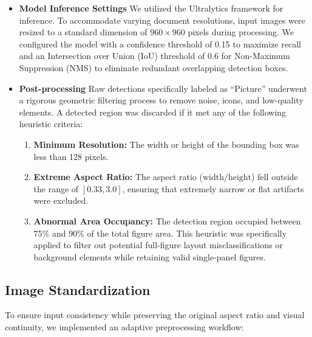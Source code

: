 \documentclass[runningheads]{llncs}
\begin{document}
\begin{itemize}
    \item \textbf{Model Inference Settings}
    We utilized the Ultralytics framework for inference. To accommodate varying document resolutions, input images were resized to a standard dimension of $960 \times 960$ pixels during processing. We configured the model with a confidence threshold of 0.15 to maximize recall and an Intersection over Union (IoU) threshold of 0.6 for Non-Maximum Suppression (NMS) to eliminate redundant overlapping detection boxes.
    
    \item \textbf{Post-processing}
    Raw detections specifically labeled as ``Picture'' underwent a rigorous geometric filtering process to remove noise, icons, and low-quality elements. A detected region was discarded if it met any of the following heuristic criteria:
    \begin{enumerate}
        \item \textbf{Minimum Resolution:} The width or height of the bounding box was less than 128 pixels.
        \item \textbf{Extreme Aspect Ratio:} The aspect ratio ($\text{width} / \text{height}$) fell outside the range of $[0.33, 3.0]$, ensuring that extremely narrow or flat artifacts were excluded.
        \item \textbf{Abnormal Area Occupancy:} The detection region occupied between $75\%$ and $90\%$ of the total figure area. This heuristic was specifically applied to filter out potential full-figure layout misclassifications or background elements while retaining valid single-panel figures.
    \end{enumerate}
\end{itemize}

\subsection{Image Standardization}
To ensure input consistency while preserving the original aspect ratio and visual continuity, we implemented an adaptive preprocessing workflow:
\end{document}
